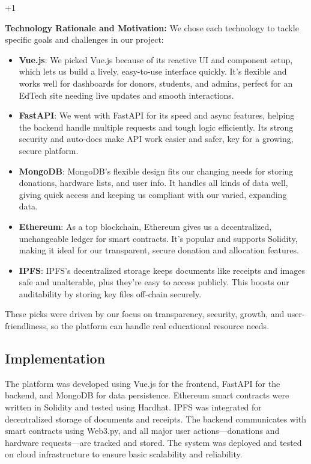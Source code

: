 +1\documentclass[conference]{IEEEtran}
\begin{document}
\textbf{Technology Rationale and Motivation:}
We chose each technology to tackle specific goals and challenges in our project:
\begin{itemize}
    \item \textbf{Vue.js}: We picked Vue.js because of its reactive UI and component setup, which lets us build a lively, easy-to-use interface quickly. It's flexible and works well for dashboards for donors, students, and admins, perfect for an EdTech site needing live updates and smooth interactions.
    \item \textbf{FastAPI}: We went with FastAPI for its speed and async features, helping the backend handle multiple requests and tough logic efficiently. Its strong security and auto-docs make API work easier and safer, key for a growing, secure platform.
    \item \textbf{MongoDB}: MongoDB's flexible design fits our changing needs for storing donations, hardware lists, and user info. It handles all kinds of data well, giving quick access and keeping us compliant with our varied, expanding data.
    \item \textbf{Ethereum}: As a top blockchain, Ethereum gives us a decentralized, unchangeable ledger for smart contracts. It's popular and supports Solidity, making it ideal for our transparent, secure donation and allocation features.
    \item \textbf{IPFS}: IPFS's decentralized storage keeps documents like receipts and images safe and unalterable, plus they're easy to access publicly. This boosts our auditability by storing key files off-chain securely.
\end{itemize}
These picks were driven by our focus on transparency, security, growth, and user-friendliness, so the platform can handle real educational resource needs.

\subsection{Implementation}
The platform was developed using Vue.js for the frontend, FastAPI for the backend, and MongoDB for data persistence. Ethereum smart contracts were written in Solidity and tested using Hardhat. IPFS was integrated for decentralized storage of documents and receipts. The backend communicates with smart contracts using Web3.py, and all major user actions—donations and hardware requests—are tracked and stored. The system was deployed and tested on cloud infrastructure to ensure basic scalability and reliability.
\end{document}
